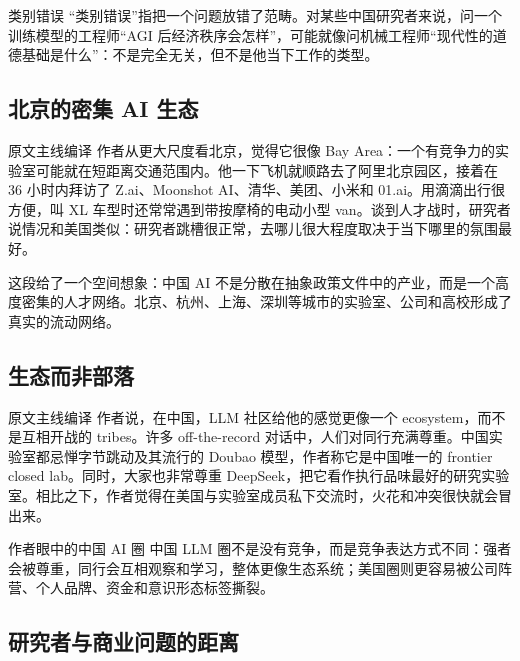 \documentclass[a4paper]{article}
\begin{document}
\begin{knowledgebox}{类别错误}
``类别错误''指把一个问题放错了范畴。对某些中国研究者来说，问一个训练模型的工程师``AGI 后经济秩序会怎样''，可能就像问机械工程师``现代性的道德基础是什么''：不是完全无关，但不是他当下工作的类型。
\end{knowledgebox}

\subsection{北京的密集 AI 生态}

\begin{translationbox}{原文主线编译}
作者从更大尺度看北京，觉得它很像 Bay Area：一个有竞争力的实验室可能就在短距离交通范围内。他一下飞机就顺路去了阿里北京园区，接着在 36 小时内拜访了 Z.ai、Moonshot AI、清华、美团、小米和 01.ai。用滴滴出行很方便，叫 XL 车型时还常常遇到带按摩椅的电动小型 van。谈到人才战时，研究者说情况和美国类似：研究者跳槽很正常，去哪儿很大程度取决于当下哪里的氛围最好。
\end{translationbox}

这段给了一个空间想象：中国 AI 不是分散在抽象政策文件中的产业，而是一个高度密集的人才网络。北京、杭州、上海、深圳等城市的实验室、公司和高校形成了真实的流动网络。

\subsection{生态而非部落}

\begin{translationbox}{原文主线编译}
作者说，在中国，LLM 社区给他的感觉更像一个 ecosystem，而不是互相开战的 tribes。许多 off-the-record 对话中，人们对同行充满尊重。中国实验室都忌惮字节跳动及其流行的 Doubao 模型，作者称它是中国唯一的 frontier closed lab。同时，大家也非常尊重 DeepSeek，把它看作执行品味最好的研究实验室。相比之下，作者觉得在美国与实验室成员私下交流时，火花和冲突很快就会冒出来。
\end{translationbox}

\begin{importantbox}{作者眼中的中国 AI 圈}
中国 LLM 圈不是没有竞争，而是竞争表达方式不同：强者会被尊重，同行会互相观察和学习，整体更像生态系统；美国圈则更容易被公司阵营、个人品牌、资金和意识形态标签撕裂。
\end{importantbox}

\subsection{研究者与商业问题的距离}
\end{document}
